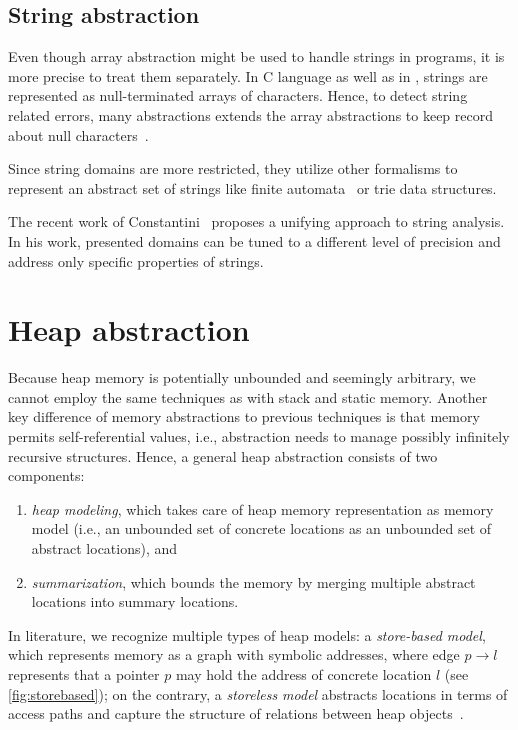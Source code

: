 \subsection{String abstraction}

Even though array abstraction might be used to handle strings in programs, it
is more precise to treat them separately. In C language as well as in \llvm,
strings are represented as null-terminated arrays of characters. Hence, to
detect string related errors, many abstractions extends the array abstractions
to keep record about null characters~\cite{Olliaro2018}.

Since string domains are more restricted, they utilize other formalisms to
represent an abstract set of strings like finite
automata~\cite{Christensen2003} or trie data structures.

The recent work of Constantini~\cite{Costantini2011, Costantini2015} proposes a
unifying approach to string analysis.  In his work, presented domains can be
tuned to a different level of precision and address only specific properties of
strings.


\section{Heap abstraction}

Because heap memory is potentially unbounded and seemingly arbitrary, we cannot
employ the same techniques as with stack and static memory. Another key
difference of memory abstractions to previous techniques is that memory permits
self-referential values, i.e., abstraction needs to manage possibly infinitely
recursive structures. Hence, a general heap abstraction consists of two
components:

\begin{enumerate}
    \item \emph{heap modeling}, which takes care of heap memory representation
        as memory model (i.e., an unbounded set of concrete locations as an
        unbounded set of abstract locations), and
    \item \emph{summarization}, which bounds the memory by merging multiple
        abstract locations into summary locations.
\end{enumerate}

\noindent
In literature, we recognize multiple types of heap models: a \emph{store-based
model}, which represents memory as a graph with symbolic addresses, where edge
$p \rightarrow l$ represents that a pointer $p$ may hold the address of
concrete location $l$ (see \autoref{fig:storebased}); on the contrary, a
\emph{storeless model} abstracts locations in terms of access paths and capture
the structure of relations between heap objects~\cite{Kanvar2016}.

